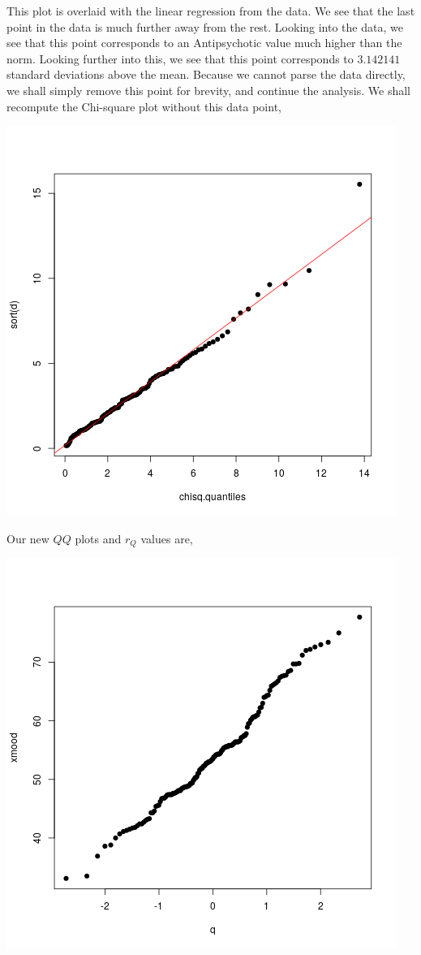 \documentclass[letterpaper,10pt]{article}
\begin{document}
\begin{enumerate}
\begin{center}
\end{center}
This plot is overlaid with the linear regression from the data. We see that the last point in the data is much further away from the rest. Looking into the data, we see that this point corresponds to an Antipsychotic value much higher than the norm. Looking further into this, we see that this point corresponds to $3.142141$ standard deviations above the mean. Because we cannot parse the data directly, we shall simply remove this point for brevity, and continue the analysis. We shall recompute the Chi-square plot without this data point,
\begin{center}
\includegraphics[scale=.8]{newchi.png}
\end{center}
Our new $QQ$ plots and $r_Q$ values are,
\begin{center}
\includegraphics[scale=.33]{newmoodq.png}

\end{center}
\end{enumerate}
\end{document}
